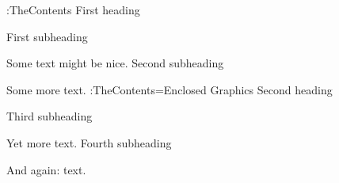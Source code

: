 \LoadExternalFile:TheContents
\TestChapter First heading\par
\TestSection First subheading\par
Some text might be nice.
\TestSection Second subheading\par
Some more text.
\ToExternalFile:TheContents={Enclosed Graphics}
\TestChapter Second heading\par
\TestSection Third subheading\par
Yet more text.
\TestSection Fourth subheading\par
And again: text.
\ExampleStop

\endinput

92/11/26 BibTeX section
